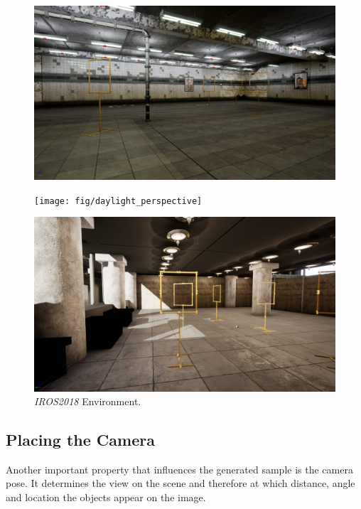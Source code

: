 \begin{figure}[hbtp]
	\centering
	\begin{minipage}{0.3\textwidth}
		\includegraphics[width=\textwidth]{fig/basement_perspective}
	\end{minipage}
	\begin{minipage}{0.3\textwidth}
		\texttt{[image: fig/daylight\_perspective]}
	\end{minipage}
	\begin{minipage}{0.3\textwidth}
		\includegraphics[width=\textwidth]{fig/iros_perspective}
	\end{minipage}
	\caption{\textit{IROS2018} Environment.}
	\label{fig:environments}
\end{figure}


\subsection{Placing the Camera}

Another important property that influences the generated sample is the camera pose. It determines the view on the scene and therefore at which distance, angle and location the objects appear on the image.

